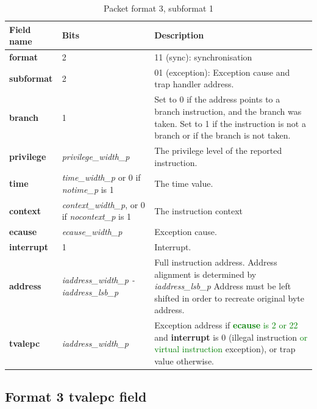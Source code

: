 \begin{table}[htp]
  \centering
  \caption{Packet format 3, subformat 1}
  \label{tab:te_inst3-1}
  \begin{tabulary}{\textwidth}{|l|p{35mm}|p{90mm}|}
    \hline
    {\bf Field name} & {\bf Bits} & {\bf Description} \\
    \hline
    \textbf{format} & 2 & 11 (sync): synchronisation\\
    \hline
    \textbf{subformat} & 2 & 01 (exception): Exception cause and trap handler address.\\
    \hline
    \textbf{branch} & 1 & Set to 0 if the address points to a branch instruction, and the branch was taken.  
              Set to 1 if the instruction is not a branch or if the branch is not taken. \\
    \hline
    \textbf{privilege} & \textit {privilege\_width\_p} & 
                The privilege level of the reported instruction.\\
    \hline
    \textbf{time} &  \textit {time\_width\_p} or 0 if \textit {notime\_p} is 1 & 
               The time value. \\
    \hline
    \textbf{context} &  \textit {context\_width\_p}, or 0 if \textit {nocontext\_p} is 1 & The instruction context  \\
    \hline
    \textbf{ecause} & \textit {ecause\_width\_p} & 
             Exception cause. \\
    \hline
    \textbf{interrupt} & 1 & 
                Interrupt. \\
    \hline
    \textbf{address} & \textit {iaddress\_width\_p - iaddress\_lsb\_p} & 
              Full instruction address.  Address alignment is determined by \textit {iaddress\_lsb\_p} Address must be left shifted in order to recreate original byte address. \\
    \hline
    \textbf{tvalepc} & \textit {iaddress\_width\_p} & 
           Exception address if \textcolor{green}{\textbf{ecause} is 2 or 22} and \textbf{interrupt} is 0 (illegal instruction \textcolor{green}{or virtual instruction} exception), or trap value otherwise.\\
    \hline
  \end{tabulary}
\end{table}

\subsection{Format 3 \textbf{tvalepc} field}

